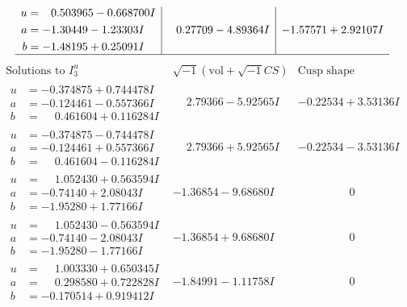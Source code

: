 \documentclass[1p]{elsarticle_modified}
\theoremstyle{definition}
\newcommand{\I}{\sqrt{-1}}
\begin{document}
$$\begin{array}{c|c|c}
\begin{aligned}
u &= \phantom{-}0.503965 - 0.668700 I \\
a &= -1.30449 - 1.23303 I \\
b &= -1.48195 + 0.25091 I\end{aligned}
 & \phantom{-}0.27709 - 4.89364 I & -1.57571 + 2.92107 I\\
 \hline 
 \end{array}$$\newpage$$\begin{array}{c|c|c}  
\text{Solutions to }I^u_{3}& \I (\text{vol} + \sqrt{-1}CS) & \text{Cusp shape}\\
 \hline 
\begin{aligned}
u &= -0.374875 + 0.744478 I \\
a &= -0.124461 - 0.557366 I \\
b &= \phantom{-}0.461604 + 0.116284 I\end{aligned}
 & \phantom{-}2.79366 - 5.92565 I & -0.22534 + 3.53136 I \\ \hline\begin{aligned}
u &= -0.374875 - 0.744478 I \\
a &= -0.124461 + 0.557366 I \\
b &= \phantom{-}0.461604 - 0.116284 I\end{aligned}
 & \phantom{-}2.79366 + 5.92565 I & -0.22534 - 3.53136 I \\ \hline\begin{aligned}
u &= \phantom{-}1.052430 + 0.563594 I \\
a &= -0.74140 + 2.08043 I \\
b &= -1.95280 + 1.77166 I\end{aligned}
 & -1.36854 - 9.68680 I & \phantom{-0.000000 } 0 \\ \hline\begin{aligned}
u &= \phantom{-}1.052430 - 0.563594 I \\
a &= -0.74140 - 2.08043 I \\
b &= -1.95280 - 1.77166 I\end{aligned}
 & -1.36854 + 9.68680 I & \phantom{-0.000000 } 0 \\ \hline\begin{aligned}
u &= \phantom{-}1.003330 + 0.650345 I \\
a &= \phantom{-}0.298580 + 0.722828 I \\
b &= -0.170514 + 0.919412 I\end{aligned}
 & -1.84991 - 1.11758 I & \phantom{-0.000000 } 0 \\ \hline\begin{aligned}

\end{aligned}
\end{array}$$
\end{document}
